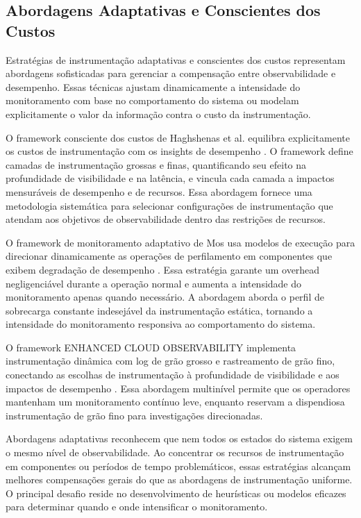 \documentclass[sigconf, anonymous]{acmart}
\begin{document}
\subsection{Abordagens Adaptativas e Conscientes dos Custos}

Estratégias de instrumentação adaptativas e conscientes dos custos representam abordagens sofisticadas para gerenciar a compensação entre observabilidade e desempenho. Essas técnicas ajustam dinamicamente a intensidade do monitoramento com base no comportamento do sistema ou modelam explicitamente o valor da informação contra o custo da instrumentação.

O framework consciente dos custos de Haghshenas et al. equilibra explicitamente os custos de instrumentação com os insights de desempenho \cite{haghshenas_2023}. O framework define camadas de instrumentação grossas e finas, quantificando seu efeito na profundidade de visibilidade e na latência, e vincula cada camada a impactos mensuráveis de desempenho e de recursos. Essa abordagem fornece uma metodologia sistemática para selecionar configurações de instrumentação que atendam aos objetivos de observabilidade dentro das restrições de recursos.

O framework de monitoramento adaptativo de Mos usa modelos de execução para direcionar dinamicamente as operações de perfilamento em componentes que exibem degradação de desempenho \cite{mos_2004}. Essa estratégia garante um overhead negligenciável durante a operação normal e aumenta a intensidade do monitoramento apenas quando necessário. A abordagem aborda o perfil de sobrecarga constante indesejável da instrumentação estática, tornando a intensidade do monitoramento responsiva ao comportamento do sistema.

O framework ENHANCED CLOUD OBSERVABILITY implementa instrumentação dinâmica com log de grão grosso e rastreamento de grão fino, conectando as escolhas de instrumentação à profundidade de visibilidade e aos impactos de desempenho \cite{ramesh_2025}. Essa abordagem multinível permite que os operadores mantenham um monitoramento contínuo leve, enquanto reservam a dispendiosa instrumentação de grão fino para investigações direcionadas.

Abordagens adaptativas reconhecem que nem todos os estados do sistema exigem o mesmo nível de observabilidade. Ao concentrar os recursos de instrumentação em componentes ou períodos de tempo problemáticos, essas estratégias alcançam melhores compensações gerais do que as abordagens de instrumentação uniforme. O principal desafio reside no desenvolvimento de heurísticas ou modelos eficazes para determinar quando e onde intensificar o monitoramento.
\end{document}
